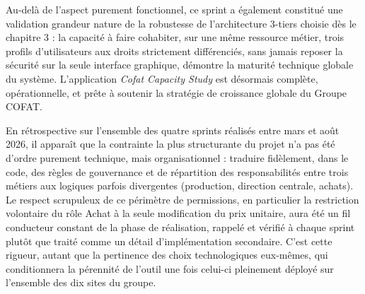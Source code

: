 Au-delà de l'aspect purement fonctionnel, ce sprint a également constitué une validation grandeur nature de la robustesse de l'architecture 3-tiers choisie dès le chapitre 3 : la capacité à faire cohabiter, sur une même ressource métier, trois profils d'utilisateurs aux droits strictement différenciés, sans jamais reposer la sécurité sur la seule interface graphique, démontre la maturité technique globale du système. L'application \textit{Cofat Capacity Study} est désormais complète, opérationnelle, et prête à soutenir la stratégie de croissance globale du Groupe COFAT.

En rétrospective sur l'ensemble des quatre sprints réalisés entre mars et août 2026, il apparaît que la contrainte la plus structurante du projet n'a pas été d'ordre purement technique, mais organisationnel : traduire fidèlement, dans le code, des règles de gouvernance et de répartition des responsabilités entre trois métiers aux logiques parfois divergentes (production, direction centrale, achats). Le respect scrupuleux de ce périmètre de permissions, en particulier la restriction volontaire du rôle Achat à la seule modification du prix unitaire, aura été un fil conducteur constant de la phase de réalisation, rappelé et vérifié à chaque sprint plutôt que traité comme un détail d'implémentation secondaire. C'est cette rigueur, autant que la pertinence des choix technologiques eux-mêmes, qui conditionnera la pérennité de l'outil une fois celui-ci pleinement déployé sur l'ensemble des dix sites du groupe.
